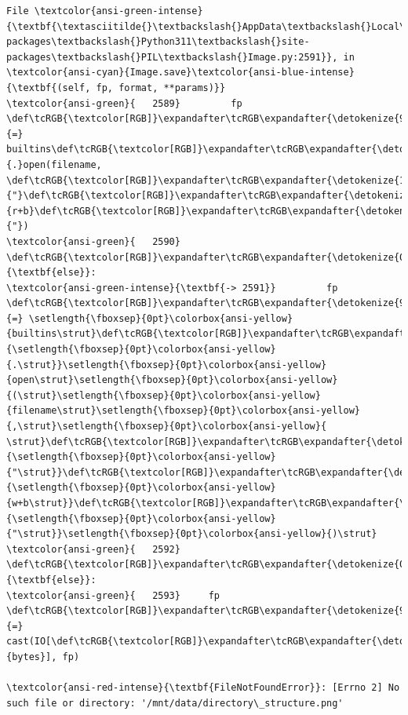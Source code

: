 \documentclass[11pt]{article}
\begin{document}
\begin{Verbatim}[commandchars=\\\{\}, frame=single, framerule=2mm, rulecolor=\color{outerrorbackground}]
File \textcolor{ansi-green-intense}{\textbf{\textasciitilde{}\textbackslash{}AppData\textbackslash{}Local\textbackslash{}Packages\textbackslash{}PythonSoftwareFoundation.Python.3.11\_qbz5n2kfra8p0\textbackslash{}LocalCache\textbackslash{}local-packages\textbackslash{}Python311\textbackslash{}site-packages\textbackslash{}PIL\textbackslash{}Image.py:2591}}, in \textcolor{ansi-cyan}{Image.save}\textcolor{ansi-blue-intense}{\textbf{(self, fp, format, **params)}}
\textcolor{ansi-green}{   2589}         fp \def\tcRGB{\textcolor[RGB]}\expandafter\tcRGB\expandafter{\detokenize{98,98,98}}{=} builtins\def\tcRGB{\textcolor[RGB]}\expandafter\tcRGB\expandafter{\detokenize{98,98,98}}{.}open(filename, \def\tcRGB{\textcolor[RGB]}\expandafter\tcRGB\expandafter{\detokenize{175,0,0}}{"}\def\tcRGB{\textcolor[RGB]}\expandafter\tcRGB\expandafter{\detokenize{175,0,0}}{r+b}\def\tcRGB{\textcolor[RGB]}\expandafter\tcRGB\expandafter{\detokenize{175,0,0}}{"})
\textcolor{ansi-green}{   2590}     \def\tcRGB{\textcolor[RGB]}\expandafter\tcRGB\expandafter{\detokenize{0,135,0}}{\textbf{else}}:
\textcolor{ansi-green-intense}{\textbf{-> 2591}}         fp \def\tcRGB{\textcolor[RGB]}\expandafter\tcRGB\expandafter{\detokenize{98,98,98}}{=} \setlength{\fboxsep}{0pt}\colorbox{ansi-yellow}{builtins\strut}\def\tcRGB{\textcolor[RGB]}\expandafter\tcRGB\expandafter{\detokenize{98,98,98}}{\setlength{\fboxsep}{0pt}\colorbox{ansi-yellow}{.\strut}}\setlength{\fboxsep}{0pt}\colorbox{ansi-yellow}{open\strut}\setlength{\fboxsep}{0pt}\colorbox{ansi-yellow}{(\strut}\setlength{\fboxsep}{0pt}\colorbox{ansi-yellow}{filename\strut}\setlength{\fboxsep}{0pt}\colorbox{ansi-yellow}{,\strut}\setlength{\fboxsep}{0pt}\colorbox{ansi-yellow}{ \strut}\def\tcRGB{\textcolor[RGB]}\expandafter\tcRGB\expandafter{\detokenize{175,0,0}}{\setlength{\fboxsep}{0pt}\colorbox{ansi-yellow}{"\strut}}\def\tcRGB{\textcolor[RGB]}\expandafter\tcRGB\expandafter{\detokenize{175,0,0}}{\setlength{\fboxsep}{0pt}\colorbox{ansi-yellow}{w+b\strut}}\def\tcRGB{\textcolor[RGB]}\expandafter\tcRGB\expandafter{\detokenize{175,0,0}}{\setlength{\fboxsep}{0pt}\colorbox{ansi-yellow}{"\strut}}\setlength{\fboxsep}{0pt}\colorbox{ansi-yellow}{)\strut}
\textcolor{ansi-green}{   2592} \def\tcRGB{\textcolor[RGB]}\expandafter\tcRGB\expandafter{\detokenize{0,135,0}}{\textbf{else}}:
\textcolor{ansi-green}{   2593}     fp \def\tcRGB{\textcolor[RGB]}\expandafter\tcRGB\expandafter{\detokenize{98,98,98}}{=} cast(IO[\def\tcRGB{\textcolor[RGB]}\expandafter\tcRGB\expandafter{\detokenize{0,135,0}}{bytes}], fp)

\textcolor{ansi-red-intense}{\textbf{FileNotFoundError}}: [Errno 2] No such file or directory: '/mnt/data/directory\_structure.png'
    \end{Verbatim}

    \begin{center}
    \end{center}
    { \hspace*{\fill} \\}
    

    
    
    
\end{document}
